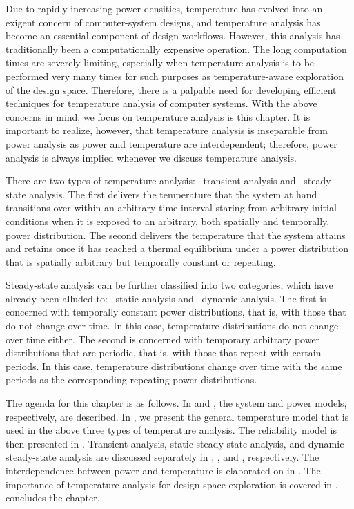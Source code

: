 Due to rapidly increasing power densities, temperature has evolved into an
exigent concern of computer-system designs, and temperature analysis has become
an essential component of design workflows. However, this analysis has
traditionally been a computationally expensive operation. The long computation
times are severely limiting, especially when temperature analysis is to be
performed very many times for such purposes as temperature-aware exploration of
the design space. Therefore, there is a palpable need for developing efficient
techniques for temperature analysis of computer systems. With the above concerns
in mind, we focus on temperature analysis is this chapter. It is important to
realize, however, that temperature analysis is inseparable from power analysis
as power and temperature are interdependent; therefore, power analysis is always
implied whenever we discuss temperature analysis.

There are two types of temperature analysis: \one~transient analysis and
\two~steady-state analysis. The first delivers the temperature that the system
at hand transitions over within an arbitrary time interval staring from
arbitrary initial conditions when it is exposed to an arbitrary, both spatially
and temporally, power distribution. The second delivers the temperature that the
system attains and retains once it has reached a thermal equilibrium under a
power distribution that is spatially arbitrary but temporally constant or
repeating.

Steady-state analysis can be further classified into two categories, which have
already been alluded to: \one~static analysis and \two~dynamic analysis. The
first is concerned with temporally constant power distributions, that is, with
those that do not change over time. In this case, temperature distributions do
not change over time either. The second is concerned with temporary arbitrary
power distributions that are periodic, that is, with those that repeat with
certain periods. In this case, temperature distributions change over time with
the same periods as the corresponding repeating power distributions.

The agenda for this chapter is as follows. In  and
, the system and power models, respectively, are described. In
, we present the general temperature model that is used
in the above three types of temperature analysis. The reliability model is then
presented in . Transient analysis, static steady-state
analysis, and dynamic steady-state analysis are discussed separately in
, , and
, respectively. The interdependence between power and
temperature is elaborated on in . The
importance of temperature analysis for design-space exploration is covered in
.  concludes the
chapter.
